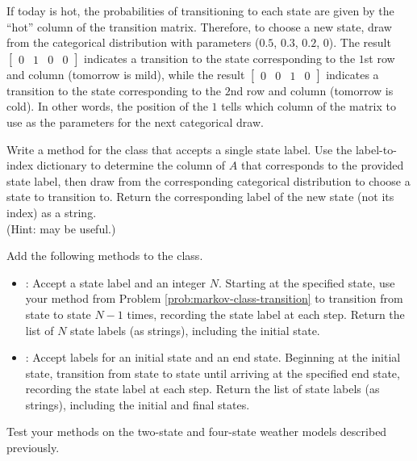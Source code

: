 If today is hot, the probabilities of transitioning to each state are given by the ``hot'' column of the transition matrix.
Therefore, to choose a new state, draw from the categorical distribution with parameters ($0.5$, $0.3$, $0.2$, $0$).
The result $\begin{bmatrix}0 & 1 & 0 & 0\end{bmatrix}$ indicates a transition to the state corresponding to the $1$st row and column (tomorrow is mild), while the result $\begin{bmatrix}0 & 0 & 1 & 0\end{bmatrix}$ indicates a transition to the state corresponding to the $2$nd row and column (tomorrow is cold).
In other words, the position of the $1$ tells which column of the matrix to use as the parameters for the next categorical draw.

\begin{problem} %
Write a method for the  class that accepts a single state label.
Use the label-to-index dictionary to determine the column of $A$ that corresponds to the provided state label, then draw from the corresponding categorical distribution to choose a state to transition to.
Return the corresponding label of the new state (not its index) as a string.
\\(Hint:  may be useful.)
\label{prob:markov-class-transition}
\end{problem}

\begin{problem} %
\label{prob:markov-class-walkers}
Add the following methods to the  class.
\begin{itemize}
\item {}: Accept a state label and an integer $N$.
Starting at the specified state, use your method from Problem \ref{prob:markov-class-transition} to transition from state to state $N-1$ times, recording the state label at each step.
Return the list of $N$ state labels (as strings), including the initial state.
\item {}: Accept labels for an initial state and an end state.
Beginning at the initial state, transition from state to state until arriving at the specified end state, recording the state label at each step.
Return the list of state labels (as strings), including the initial and final states.
\end{itemize}
Test your methods on the two-state and four-state weather models described previously.
\end{problem}

